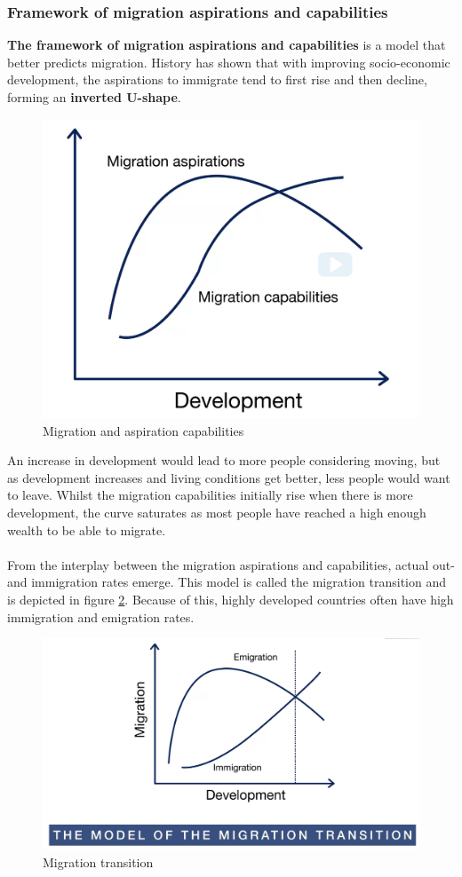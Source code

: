 \documentclass[../summary.tex]{subfiles}
\begin{document}
	\subsubsection{Framework of migration aspirations and capabilities}
	\textbf{The framework of migration aspirations and capabilities} is a model that better predicts migration. History has shown that with improving socio-economic development, the aspirations to immigrate tend to first rise and then decline, forming an \textbf{inverted U-shape}. 
	\begin{figure}[h]
		\centering
		\includegraphics[width=0.6\linewidth]{../images/7-framework-capabilites}
		\caption{Migration and aspiration capabilities}
		\label{fig:7-framework-capabilites}
	\end{figure}
	
	An increase in development would lead to more people considering moving, but as development increases and living conditions get better, less people would want to leave. Whilst the migration capabilities initially rise when there is more development, the curve saturates as most people have reached a high enough wealth to be able to migrate. 
	\\\\
	From the interplay between the migration aspirations and capabilities, actual out- and immigration rates emerge. This model is called the migration transition and is depicted in figure \ref{fig:7-migration-transition}. Because of this, highly developed countries often have high immigration and emigration rates.
	\begin{figure}[h]
		\centering
		\includegraphics[width=0.7\linewidth]{../images/7-migration-transition}
		\caption{Migration transition}
		\label{fig:7-migration-transition}
	\end{figure}
	
\end{document}
